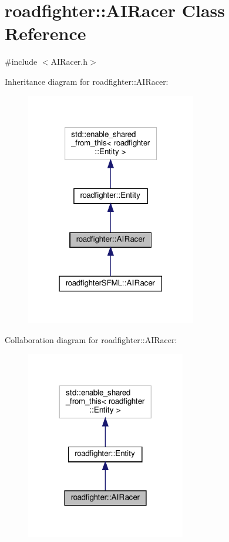 \hypertarget{classroadfighter_1_1AIRacer}{}\section{roadfighter\+:\+:A\+I\+Racer Class Reference}
\label{classroadfighter_1_1AIRacer}


{\ttfamily \#include $<$A\+I\+Racer.\+h$>$}



Inheritance diagram for roadfighter\+:\+:A\+I\+Racer\+:\nopagebreak
\begin{figure}[H]
\begin{center}
\leavevmode
\includegraphics[width=211pt]{classroadfighter_1_1AIRacer__inherit__graph}
\end{center}
\end{figure}


Collaboration diagram for roadfighter\+:\+:A\+I\+Racer\+:\nopagebreak
\begin{figure}[H]
\begin{center}
\leavevmode
\includegraphics[width=197pt]{classroadfighter_1_1AIRacer__coll__graph}
\end{center}
\end{figure}
